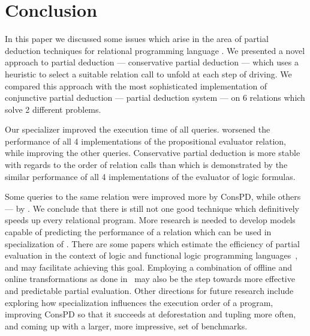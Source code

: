 \section{Conclusion}

In this paper we discussed some issues which arise in the area of partial deduction techniques for relational programming language \mk.
We presented a novel approach to partial deduction --- conservative partial deduction --- which uses a heuristic to select a suitable relation call to unfold at each step of driving.
We compared this approach with the most sophisticated implementation of conjunctive partial deduction --- \ecce partial deduction system --- on 6 relations which solve 2 different problems.

Our specializer improved the execution time of all queries.
\ecce worsened the performance of all 4 implementations of the propositional evaluator relation, while improving the other queries.
Conservative partial deduction is more stable with regards to the order of relation calls than \ecce which is demonstrated by the similar performance of all 4 implementations of the evaluator of logic formulas.

Some queries to the same relation were improved more by ConsPD, while others --- by \ecce.
We conclude that there is still not one good technique which definitively speeds up every relational program.
More research is needed to develop models capable of predicting the performance of a relation which can be used in specialization of \mk.
There are some papers which estimate the efficiency of partial evaluation in the context of logic and functional logic programming languages~\cite{vidal2004cost,vidal2008trace}, and may facilitate achieving this goal.
Employing a combination of offline and online transformations as done in~\cite{hybrid} may also be the step towards more effective and predictable partial evaluation.
Other directions for future research include exploring how specialization influences the execution order of a \mk program, improving ConsPD so that it succeeds at deforestation and tupling more often, and coming up with a larger, more impressive, set of benchmarks.